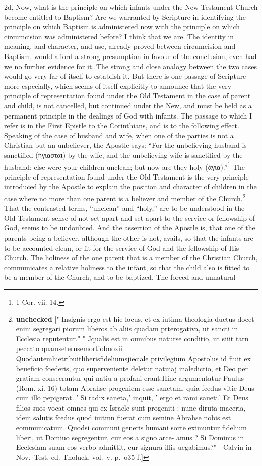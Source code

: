 \documentclass[]{book}
\begin{document}
2d, Now, what is the principle on which infants under the New Testament Church become entitled to Baptism? Are we warranted by Scripture in identifying the principle on which Baptism is administered now with the principle on which circumcision was administered before? I think that we are. The identity in meaning, and character, and use, already proved between circumcision and Baptism, would afford a strong presumption in favour of the conclusion, even had we no further evidence for it. The strong and close analogy between the two cases would go very far of itself to establish it. But there is one passage of Scripture more especially, which seems of itself explicitly to announce that the very principle of representation found under the Old Testament in the case of parent and child, is not cancelled, but continued under the New, and must be held as a permanent principle in the dealings of God with infants. The passage to which I refer is in the First Epistle to the Corinthians, and is to the following effect. Speaking of the case of husband and wife, when one of the parties is not a Christian but an unbeliever, the Apostle says: ``For the unbelieving husband is sanctified (ἡγιασται) by the wife, and the unbelieving wife is sanctified by the husband: else were your children unclean; but now are they holy (ἁγια).''\footnote{1 Cor. vii. 14.} The principle of representation found under the Old Testament is the very principle introduced by the Apostle to explain the position and character of children in the case where no more than one parent is a believer and member of the Church.\footnote{\textbf{unchecked} {[}" Insignis ergo est hie locus, et ex iutima theologia ductus docet enini segregari piorum liberos ab aliis quadam prterogativa, ut sancti in Ecclesia reputentur." " Jqualis est in oumibus naturse conditio, ut siiit tarn peccato quamseternsemortiobnoxii. Quodautemhietribuitliberisfideliumsjieciale privilegium Apostolus id fiuit ex beueficio foederis, quo superveniente deletur natuiaj inaledictio, et Deo per gratiam consecrantur qui natiu-a profani erant.Hinc argumentatur Paulus (Rom. xi. 16) totam Abrahse progeniem esse sanctam, quia fcedus vitie Deus cum illo pepigerat. ' Si radix saneta,' inquit, ' ergo et rami saueti.' Et Deus filios suos vocat omnes qui ex Israele sunt progeniti : nunc diruta maceria, idem salutis fcedus quod iuitmn fuerat cum semine Abrahse nobis est eommunicatum. Quodsi communi generis humani sorte eximuntur fidelium liberi, ut Domiuo segregentur, cur eos a signo arce- amus ? Si Dominus in Eeclesiam suam eos verbo admittit, cur signura illis uegabimus?"---Calvin in Nov.~Test. ed. Tholuck, vol.~v. p.~o35 f.{]}} That the contrasted terms, ``unclean'' and ``holy,'' are to be understood in the Old Testament sense of not set apart and set apart to the service or fellowship of God, seems to be undoubted. And the assertion of the Apostle is, that one of the parents being a believer, although the other is not, avails, so that the infants are to be accounted clean, or fit for the service of God and the fellowship of His Church. The holiness of the one parent that is a member of the Christian Church, communicates a relative holiness to the infant, so that the child also is fitted to be a member of the Church, and to be baptized. The forced and unnatural 
\end{document}
